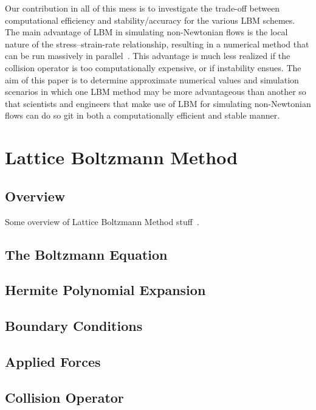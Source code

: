 \documentclass{article}
\begin{document}
Our contribution in all of this mess is to investigate the trade-off between computational efficiency and stability/accuracy for the various LBM schemes.
The main advantage of LBM in simulating non-Newtonian flows is the local nature of the stress--strain-rate relationship, resulting in a numerical method that can be run massively in parallel~\cite{something}.
This advantage is much less realized if the collision operator is too computationally expensive, or if instability ensues.
The aim of this paper is to determine approximate numerical values and simulation scenarios in which one LBM method may be more advantageous than another so that scientists and engineers that make use of LBM for simulating non-Newtonian flows can do so git in both a computationally efficient and stable manner. %

\section{Lattice Boltzmann Method}

\subsection{Overview}

Some overview of Lattice Boltzmann Method stuff~\cite{grasinger2015simulation}.

\subsection{The Boltzmann Equation}

\subsection{Hermite Polynomial Expansion}

\subsection{Boundary Conditions}

\subsection{Applied Forces}

\subsection{Collision Operator} %
\end{document}
